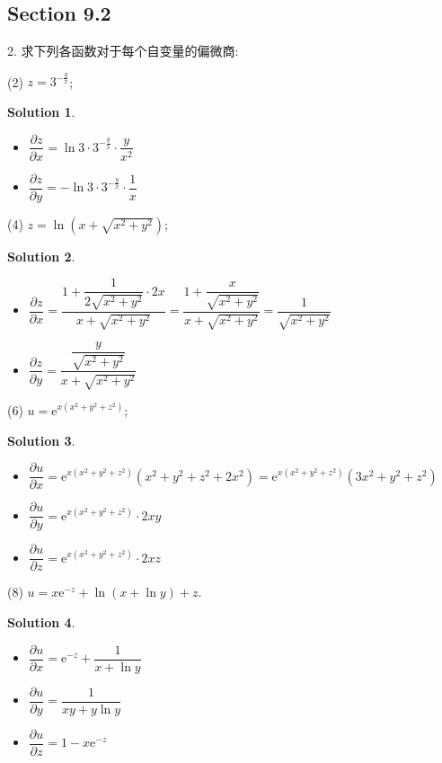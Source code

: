 \documentclass[a4paper,12pt]{article}
\newtheorem*{sol}{Solution}
\begin{document}
\subsection*{Section 9.2}

2. 求下列各函数对于每个自变量的偏微商:

(2) $z = 3^{-\frac{y}{x}}$;
\begin{sol}
    \begin{itemize}
        \item $\dfrac{\partial z}{\partial x}=\ln 3\cdot 3^{-\frac{y}{x}}\cdot\dfrac{y}{x^2}$
        \item $\dfrac{\partial z}{\partial y}=-\ln 3\cdot 3^{-\frac{y}{x}}\cdot\dfrac{1}{x}$
    \end{itemize}
\end{sol}

(4) $z = \ln\left(x + \sqrt{x^2 + y^2}\right)$;
\begin{sol}
    \begin{itemize}
        \item $\dfrac{\partial z}{\partial x}=\dfrac{1+\dfrac{1}{2\sqrt{x^2 + y^2}}\cdot 2x}{x + \sqrt{x^2 + y^2}}=\dfrac{1+\dfrac{x}{\sqrt{x^2 + y^2}}}{x + \sqrt{x^2 + y^2}}=\dfrac{1}{\sqrt{x^2 + y^2}}$
        \item $\dfrac{\partial z}{\partial y}=\dfrac{\dfrac{y}{\sqrt{x^2 + y^2}}}{x + \sqrt{x^2 + y^2}}$
    \end{itemize}
\end{sol}

(6) $u = \mathrm{e}^{x(x^2 + y^2 + z^2)}$;
\begin{sol}
    \begin{itemize}
        \item $\dfrac{\partial u}{\partial x}=\mathrm{e}^{x(x^2 + y^2 + z^2)}(x^2 + y^2 + z^2+2x^2)=\mathrm{e}^{x(x^2 + y^2 + z^2)}(3x^2 + y^2 + z^2)$
        \item $\dfrac{\partial u}{\partial y}=\mathrm{e}^{x(x^2 + y^2 + z^2)}\cdot 2xy$
        \item $\dfrac{\partial u}{\partial z}=\mathrm{e}^{x(x^2 + y^2 + z^2)}\cdot 2xz$
    \end{itemize}
\end{sol}

(8) $u = x\mathrm{e}^{-z} + \ln\left(x + \ln y\right) + z$.
\begin{sol}
    \begin{itemize}
        \item $\dfrac{\partial u}{\partial x}=\mathrm{e}^{-z}+\dfrac{1}{x+\ln y}$
        \item $\dfrac{\partial u}{\partial y}=\dfrac{1}{xy+y\ln y}$
        \item $\dfrac{\partial u}{\partial z}=1-x\mathrm{e}^{-z}$
    \end{itemize}
\end{sol}
\end{document}
